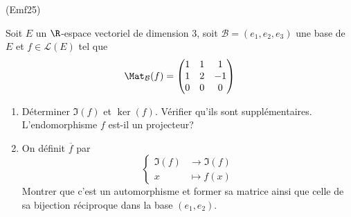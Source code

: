 \begin{tiny}(Emf25)\end{tiny} Soit $E$ un $\R$-espace vectoriel de dimension $3$, soit $\mathcal{B}=(e_1,e_2,e_3)$ une base de $E$ et $f\in \mathcal{L}(E)$ tel que 
\begin{displaymath}
  \Mat_{\mathcal{B}}(f)=
\begin{pmatrix}
  1 & 1 & 1 \\ 1 & 2 & -1 \\ 0 & 0 & 0
\end{pmatrix}
\end{displaymath}
\begin{enumerate}
  \item Déterminer $\Im(f)$ et $\ker(f)$. Vérifier qu'ils sont supplémentaires. L'endomorphisme $f$ est-il un projecteur?
  \item On définit $\overline{f}$ par
\begin{displaymath}
  \left\lbrace 
  \begin{aligned}
    \Im(f) &\rightarrow \Im(f) \\ x &\mapsto f(x)
  \end{aligned}
\right. 
\end{displaymath}
Montrer que c'est un automorphisme et former sa matrice ainsi que celle de sa bijection réciproque dans la base $(e_1,e_2)$. 
\end{enumerate}
